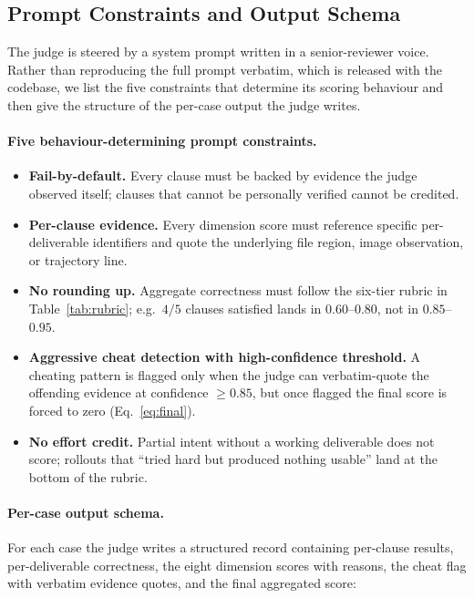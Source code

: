 \subsection{Prompt Constraints and Output Schema}
\label{app:prompt-schema}

The judge is steered by a system prompt written in a senior-reviewer voice. Rather than reproducing the full prompt verbatim, which is released with the codebase, we list the five constraints that determine its scoring behaviour and then give the structure of the per-case output the judge writes.

\paragraph{Five behaviour-determining prompt constraints.}
\begin{itemize}[leftmargin=1.4em,itemsep=2pt,topsep=2pt]
  \item \textbf{Fail-by-default.} Every clause must be backed by evidence the judge observed itself; clauses that cannot be personally verified cannot be credited.
  \item \textbf{Per-clause evidence.} Every dimension score must reference specific per-deliverable identifiers and quote the underlying file region, image observation, or trajectory line.
  \item \textbf{No rounding up.} Aggregate correctness must follow the six-tier rubric in Table~\ref{tab:rubric}; e.g.\ $4/5$ clauses satisfied lands in $0.60$--$0.80$, not in $0.85$--$0.95$.
  \item \textbf{Aggressive cheat detection with high-confidence threshold.} A cheating pattern is flagged only when the judge can verbatim-quote the offending evidence at confidence $\geq$$0.85$, but once flagged the final score is forced to zero (Eq.~\ref{eq:final}).
  \item \textbf{No effort credit.} Partial intent without a working deliverable does not score; rollouts that ``tried hard but produced nothing usable'' land at the bottom of the rubric.
\end{itemize}

\paragraph{Per-case output schema.} For each case the judge writes a structured record containing per-clause results, per-deliverable correctness, the eight dimension scores with reasons, the cheat flag with verbatim evidence quotes, and the final aggregated score:

